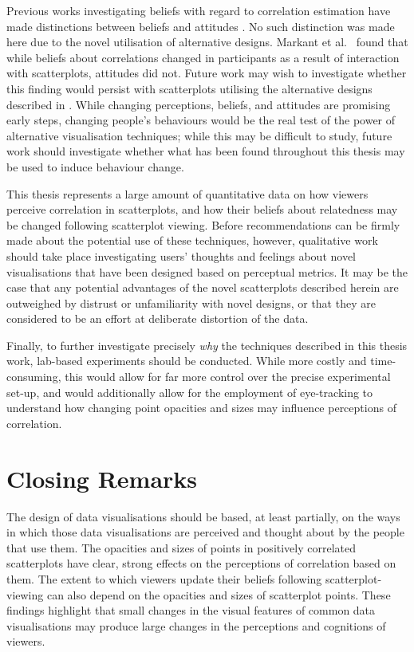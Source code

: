 \documentclass[../main.tex]{subfiles}
\begin{document}
Previous works investigating beliefs with regard to correlation
estimation have made distinctions between beliefs and attitudes
\cite{xiong_2023, markant_2023}. No such distinction was made here due
to the novel utilisation of alternative designs. Markant et
al.~\cite{markant_2023} found that while beliefs about correlations
changed in participants as a result of interaction with scatterplots,
attitudes did not. Future work may wish to investigate whether this
finding would persist with scatterplots utilising the alternative
designs described in . While changing
perceptions, beliefs, and attitudes are promising early steps, changing
people's behaviours would be the real test of the power of alternative
visualisation techniques; while this may be difficult to study, future
work should investigate whether what has been found throughout this
thesis may be used to induce behaviour change.

This thesis represents a large amount of quantitative data on how
viewers perceive correlation in scatterplots, and how their beliefs
about relatedness may be changed following scatterplot viewing. Before
recommendations can be firmly made about the potential use of these
techniques, however, qualitative work should take place investigating
users' thoughts and feelings about novel visualisations that have been
designed based on perceptual metrics. It may be the case that any
potential advantages of the novel scatterplots described herein are
outweighed by distrust or unfamiliarity with novel designs, or that they
are considered to be an effort at deliberate distortion of the data.

Finally, to further investigate precisely \emph{why} the techniques
described in this thesis work, lab-based experiments should be
conducted. While more costly and time-consuming, this would allow for
far more control over the precise experimental set-up, and would
additionally allow for the employment of eye-tracking to understand how
changing point opacities and sizes may influence perceptions of
correlation.

\section{Closing Remarks}\label{closing-remarks}

The design of data visualisations should be based, at least partially,
on the ways in which those data visualisations are perceived and thought
about by the people that use them. The opacities and sizes of points in
positively correlated scatterplots have clear, strong effects on the
perceptions of correlation based on them. The extent to which viewers
update their beliefs following scatterplot-viewing can also depend on
the opacities and sizes of scatterplot points. These findings highlight
that small changes in the visual features of common data visualisations
may produce large changes in the perceptions and cognitions of viewers.
\end{document}
